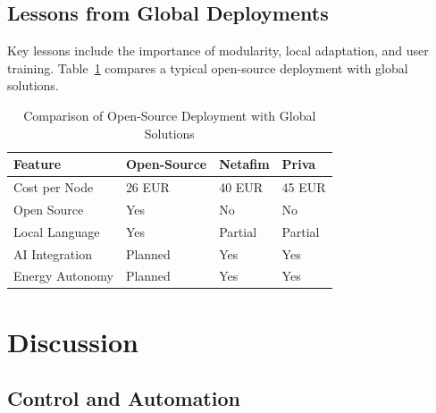 \documentclass[12pt,a4paper]{article}
\begin{document}
\subsection{Lessons from Global Deployments}
Key lessons include the importance of modularity, local adaptation, and user training. Table~\ref{tab:compare} compares a typical open-source deployment with global solutions.

\begin{table}[H]
    \centering
    \caption{Comparison of Open-Source Deployment with Global Solutions}
    \begin{tabular}{@{}llll@{}}
    \toprule
    Feature & Open-Source & Netafim & Priva \\
    \midrule
    Cost per Node & 26 EUR & 40 EUR & 45 EUR \\
    Open Source & Yes & No & No \\
    Local Language & Yes & Partial & Partial \\
    AI Integration & Planned & Yes & Yes \\
    Energy Autonomy & Planned & Yes & Yes \\
    \bottomrule
    \end{tabular}
    \label{tab:compare}
\end{table}

\section{Discussion}
\subsection{Control and Automation}
\end{document}
